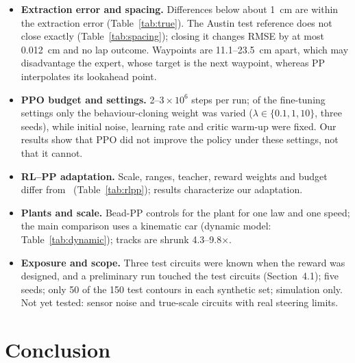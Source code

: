 \documentclass[10pt,twocolumn,twoside]{article}
\begin{document}
\begin{itemize}
\item \textbf{Extraction error and spacing.} Differences below about 1~cm are
  within the extraction error (Table~\ref{tab:true}). The Austin test reference does not close exactly
  (Table~\ref{tab:spacing}); closing it changes RMSE by at most 0.012~cm and no
  lap outcome. Waypoints are 11.1--23.5~cm apart, which may disadvantage the
  expert, whose target is the next waypoint, whereas PP interpolates its
  lookahead point.
\item \textbf{PPO budget and settings.} 2--$3\times10^{6}$ steps per run; of the
  fine-tuning settings only the behaviour-cloning weight was varied
  ($\lambda\in\{0.1,1,10\}$, three seeds), while initial noise, learning rate
  and critic warm-up were fixed. Our results show that PPO did not improve the
  policy under these settings, not that it cannot.
\item \textbf{RL--PP adaptation.} Scale, ranges, teacher, reward weights and
  budget differ from~\cite{elgouhary2026} (Table~\ref{tab:rlpp}); results
  characterize our adaptation.
\item \textbf{Plants and scale.} Bead-PP controls for the plant for one law and
  one speed; the main comparison uses a kinematic car (dynamic model:
  Table~\ref{tab:dynamic}); tracks are shrunk 4.3--9.8$\times$.
\item \textbf{Exposure and scope.} Three test circuits were known when the
  reward was designed, and a preliminary run touched the test circuits
  (Section~4.1); five seeds; only 50 of the 150 test contours in each synthetic set;
  simulation only. Not yet tested: sensor noise and true-scale circuits with
  real steering limits.
\end{itemize}

\section{Conclusion}
\end{document}
